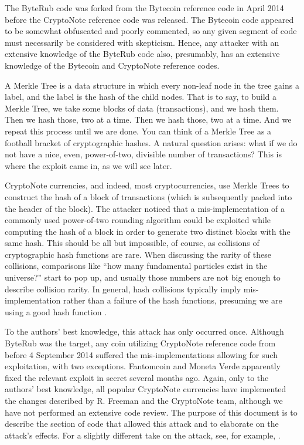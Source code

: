 \documentclass{mrl}
\begin{document}
The ByteRub code was forked from the Bytecoin reference code in April 2014 before the CryptoNote reference code was released. The Bytecoin code appeared to be somewhat obfuscated and poorly commented, so any given segment of code must necessarily be considered with skepticism. Hence, any attacker with an extensive knowledge of the ByteRub code also, presumably, has an extensive knowledge of the Bytecoin and CryptoNote reference codes.

A Merkle Tree is a data structure in which every non-leaf node in the tree gains a label, and the label is the hash of the child nodes\cite{merkle1988digital}. That is to say, to build a Merkle Tree, we take some blocks of data (transactions), and we hash them. Then we hash those, two at a time. Then we hash those, two at a time. And we repeat this process until we are done. You can think of a Merkle Tree as a football bracket of cryptographic hashes. A natural question arises: what if we do not have a nice, even, power-of-two, divisible number of transactions? This is where the exploit came in, as we will see later.

CryptoNote currencies, and indeed, most cryptocurrencies, use Merkle Trees to construct the hash of a block of transactions (which is subsequently packed into the header of the block). The attacker noticed that a mis-implementation of a commonly used power-of-two rounding algorithm could be exploited while computing the hash of a block in order to generate two distinct blocks with the same hash. This should be all but impossible, of course, as collisions of cryptographic hash functions are rare. When discussing the rarity of these collisions, comparisons like ``how many fundamental particles exist in the universe?'' start to pop up, and usually those numbers are not big enough to describe collision rarity. In general, hash collisions typically imply mis-implementation rather than a failure of the hash functions, presuming we are using a good hash function \cite{anderson1993classification}.

To the authors' best knowledge, this attack has only occurred once. Although ByteRub was the target, any coin utilizing CryptoNote reference code from before 4 September 2014 suffered the mis-implementations allowing for such exploitation, with two exceptions. Fantomcoin and Moneta Verde apparently fixed the relevant exploit in secret several months ago. Again, only to the authors' best knowledge, all popular CryptoNote currencies have implemented the changes described by R. Freeman and the CryptoNote team, although we have not performed an extensive code review. The purpose of this document is to describe the section of code that allowed this attack and to elaborate on the attack's effects. For a slightly different take on the attack, see, for example, \cite{CryptoNote:2014}.
\end{document}
